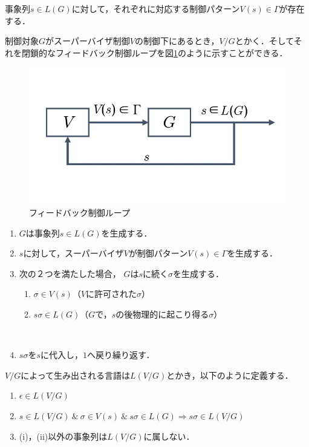 事象列$s \in L(G)$に対して，それぞれに対応する制御パターン$V(s) \in \Gamma$が存在する．

制御対象$G$がスーパーバイザ制御$V$の制御下にあるとき，$V/G$とかく．そしてそれを閉鎖的なフィードバック制御ループを図\ref{fig:Feedback_Control_Loop}のように示すことができる．

\begin{figure}[h]
    \centering
    \includegraphics[scale=0.45]{figures/Feedback_Control_Loop.jpg}
    \caption{フィードバック制御ループ}
    \label{fig:Feedback_Control_Loop}
\end{figure}

\begin{enumerate}
    \item $G$は事象列$s \in L(G)$を生成する．
    \item $s$に対して，スーパーバイザ$V$が制御パターン$V(s) \in \Gamma$を生成する．
    \item 次の２つを満たした場合， $G$は$s$に続く$\sigma$を生成する．
    \begin{enumerate}
        \renewcommand{\theenumii}{\roman{enumii}}
        \item $\sigma \in V(s)$（$V$に許可された$\sigma$）
        \item $s\sigma \in L(G)$（$G$で，$s$の後物理的に起こり得る$\sigma$）
        \end{enumerate}
　　\item $s\sigma$を$s$に代入し，$1$へ戻り繰り返す．
\end{enumerate}

$V/G$によって生み出される言語は$L(V/G)$とかき，以下のように定義する．
\begin{enumerate}
    \renewcommand{\labelenumi}{(\roman{enumi})}
    \item $\epsilon \in L(V/G)$
    \item $s \in L(V/G)\ \&\ \sigma \in V(s)\ \&\ s\sigma \in L(G) \Rightarrow s\sigma  \in L(V/G)$
    \item (i)，(ii)以外の事象列は$L(V/G)$に属しない．
\end{enumerate}

